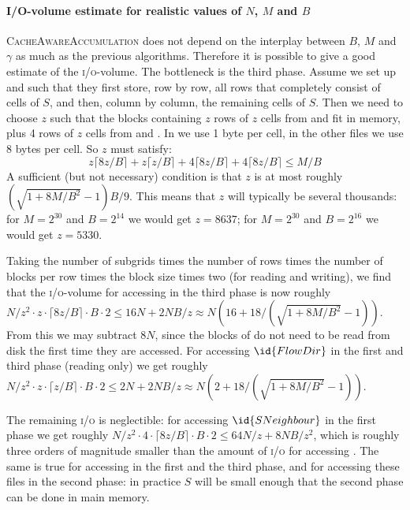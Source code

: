 \documentclass[10pt,a4paper]{article}
\def\io{\textsc{i/o}\xspace}
\begin{document}
\paragraph*{I/O-volume estimate for realistic values of $N$, $M$ and $B$}
\textsc{CacheAwareAccumulation} does not depend on the interplay between $B$, $M$ and $\gamma$ as much as the previous algorithms. Therefore it is possible to give a good estimate of the \io-volume. The bottleneck is the third phase. Assume we set up  and  such that they first store, row by row, all rows that completely consist of cells of $S$, and then, column by column, the remaining cells of $S$. Then we need to choose $z$ such that the blocks containing $z$ rows of $z$ cells from  and  fit in memory, plus 4 rows of $z$ cells from  and . In  we use 1 byte per cell, in the other files we use 8 bytes per cell. So $z$ must satisfy:\[
z \lceil 8z / B \rceil + z \lceil z/B \rceil + 4 \lceil 8z/B \rceil + 4 \lceil 8z/B \rceil \leq M/B
\]
A sufficient (but not necessary) condition is that $z$ is at most roughly $(\sqrt{1 + 8M/B^2} - 1) B/9$. This means that $z$ will typically be several thousands:
for $M = 2^{30}$ and $B = 2^{14}$ we would get $z = 8637$; for $M = 2^{30}$ and $B = 2^{16}$ we would get $z = 5330$.

Taking the number of subgrids times the number of rows times the number of blocks per row times the block size times two (for reading and writing), we find that the \io-volume for accessing  in the third phase is now roughly
$N/z^2 \cdot z \cdot \lceil 8z/B\rceil \cdot B \cdot 2 \leq 16N + 2NB/z \approx N (16 + 18/(\sqrt{1 + 8M/B^2}-1))$.
From this we may subtract $8N$, since the blocks of  do not need to be read from disk the first time they are accessed.
For accessing $\id{FlowDir}$ in the first and third phase (reading only) we get roughly
$N/z^2 \cdot z \cdot \lceil z/B\rceil \cdot B \cdot 2 \leq 2N + 2NB/z \approx N (2 + 18/(\sqrt{1 + 8M/B^2}-1))$.

The remaining \io is neglectible: for accessing $\id{SNeighbour}$ in the first phase we get roughly
$N/z^2 \cdot 4 \cdot \lceil 8z/B\rceil \cdot B \cdot 2 \leq 64N/z + 8NB/z^2$, which is roughly three orders of magnitude smaller than the amount of \io for accessing . The same is true for accessing  in the first and the third phase, and for accessing these files in the second phase: in practice $S$ will be small enough that the second phase can be done in main memory.
\end{document}
